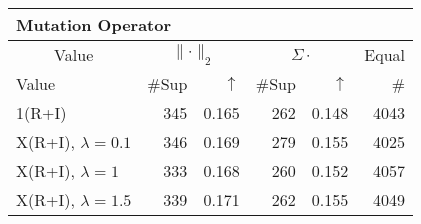 \begin{center}
\renewcommand{\tabcolsep}{4pt}
\renewcommand{\arraystretch}{1.1}
\begin{customnormal}
\begin{tabular}{lrrrrr}
\multicolumn{6}{l}{Mutation Operator}\\
\toprule
\multicolumn{1}{c}{Value} & \multicolumn{2}{c}{$\lVert \cdot \rVert_2$} & \multicolumn{2}{c}{$\Sigma \cdot$} & \multicolumn{1}{c}{Equal} \\ 
\cmidrule(lr){1-1} \cmidrule(lr){2-3} \cmidrule(lr){4-5}  \cmidrule(lr){6-6}
Value & \#Sup & $\uparrow$ & \#Sup & $\uparrow$ & \# \\ 
\midrule
1(R+I) & 345 & 0.165 & 262 & 0.148 & 4043 \\ 
X(R+I), $\lambda=0.1$ & 346 & 0.169 & 279 & 0.155 & 4025 \\ 
X(R+I), $\lambda=1$ & 333 & 0.168 & 260 & 0.152 & 4057 \\ 
X(R+I), $\lambda=1.5$ & 339 & 0.171 & 262 & 0.155 & 4049 \\ 
\bottomrule
\end{tabular}


\end{customnormal}
\end{center}
